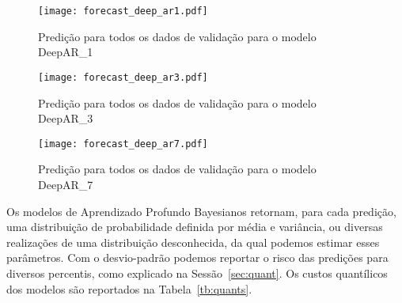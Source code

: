 \begin{figure}[H]
  \centering
  \texttt{[image: forecast\_deep\_ar1.pdf]} 
  \caption{Predição para todos os dados de validação para o modelo DeepAR\_1}
  \label{fig:fordeepar1}
\end{figure}

\begin{figure}[H]
  \centering
  \texttt{[image: forecast\_deep\_ar3.pdf]} 
  \caption{Predição para todos os dados de validação para o modelo DeepAR\_3}
  \label{fig:fordeepar3}
\end{figure}

\begin{figure}[H]
  \centering
  \texttt{[image: forecast\_deep\_ar7.pdf]} 
  \caption{Predição para todos os dados de validação para o modelo DeepAR\_7}
  \label{fig:fordeepar7}
\end{figure}


Os modelos de Aprendizado Profundo Bayesianos retornam, para cada predição, uma distribuição de
probabilidade definida por média e variância, ou diversas realizações de uma
distribuição desconhecida, da qual podemos estimar esses parâmetros. 
Com o desvio-padrão podemos reportar o risco das predições para diversos percentis, como explicado na
Sessão~\ref{sec:quant}. Os custos quantílicos dos modelos são reportados na
Tabela~\ref{tb:quants}.


